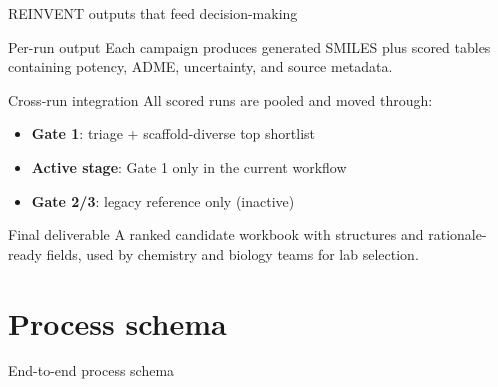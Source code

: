 \documentclass[aspectratio=169,10pt]{beamer}
\begin{document}
\begin{frame}{REINVENT outputs that feed decision-making}
  \small
  \begin{block}{Per-run output}
    Each campaign produces generated SMILES plus scored tables containing
    potency, ADME, uncertainty, and source metadata.
  \end{block}

  \begin{block}{Cross-run integration}
    All scored runs are pooled and moved through:
    \begin{itemize}
      \item \textbf{Gate 1}: triage + scaffold-diverse top shortlist
      \item \textbf{Active stage}: Gate 1 only in the current workflow
      \item \textbf{Gate 2/3}: legacy reference only (inactive)
    \end{itemize}
  \end{block}

  \begin{exampleblock}{Final deliverable}
    A ranked candidate workbook with structures and rationale-ready fields,
    used by chemistry and biology teams for lab selection.
  \end{exampleblock}
\end{frame}

\section{Process schema}

\begin{frame}{End-to-end process schema}
  \begin{center}
  \end{center}
\end{frame}
\end{document}
